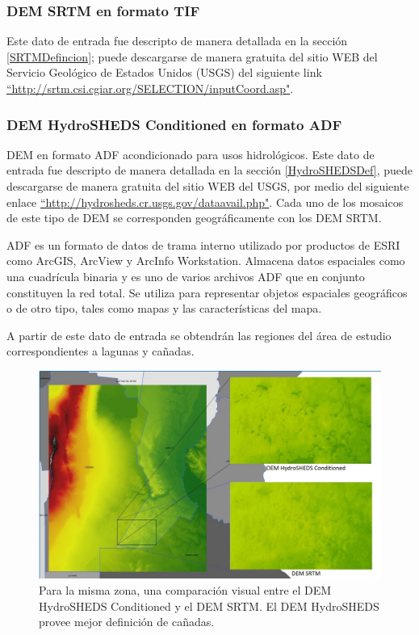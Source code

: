 \documentclass[10pt,a4paper, twoside]{report}
\begin{document}
\subsubsection{DEM SRTM en formato TIF}

Este dato de entrada fue descripto de manera detallada en la sección \ref{SRTMDefincion}; puede descargarse de manera gratuita del sitio WEB del Servicio Geológico de Estados Unidos (USGS) del siguiente link  \hyperref[http://srtm.csi.cgiar.org/SELECTION/inputCoord.asp]{``http://srtm.csi.cgiar.org/SELECTION/inputCoord.asp"}.


\subsubsection{DEM HydroSHEDS Conditioned en formato ADF}


DEM en formato ADF acondicionado para usos hidrológicos. Este dato de entrada fue descripto de manera detallada en la sección \ref{HydroSHEDSDef}, puede descargarse de manera gratuita del sitio WEB del USGS, por medio del siguiente enlace  \hyperref[http://hydrosheds.cr.usgs.gov/dataavail.php]{``http://hydrosheds.cr.usgs.gov/dataavail.php"}. Cada uno de los mosaicos de este tipo de DEM se corresponden geográficamente con los DEM SRTM.

ADF es un formato de datos de trama interno utilizado por productos de ESRI como ArcGIS, ArcView y ArcInfo Workstation. Almacena datos espaciales como una cuadrícula binaria y es uno de varios archivos ADF que en conjunto constituyen la red total. Se utiliza para representar objetos espaciales geográficos o de otro tipo, tales como mapas y las características del mapa.

A partir de este dato de entrada se obtendrán las regiones del área de estudio correspondientes a lagunas y cañadas.

\begin{figure}[!htb]
   \centering      
   \includegraphics[width=1.0\textwidth]{imagenes/ComparacionHydroSHEDSSRTM.jpg}
 \caption{Para la misma zona, una comparación visual entre el DEM HydroSHEDS Conditioned y el DEM SRTM. El DEM HydroSHEDS provee mejor definición de cañadas.}
 \label{HydroSHEDSSRTM}
\end{figure}
\end{document}
